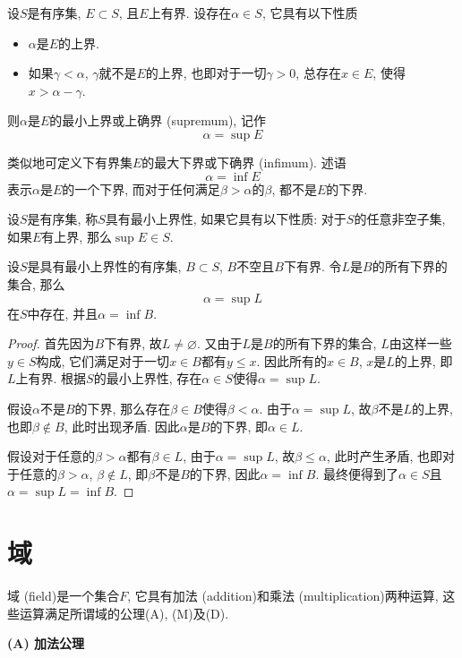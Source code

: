 \documentclass[cn,12pt,math=mtpro2,citestyle=gb7714-2015,bibstyle=gb7714-2015,twocol]{elegantbook}
\let\emptyset\varnothing
\begin{document}
\begin{definition}
设$S$是有序集, $E\subset S$, 且$E$上有界. 设存在$\alpha\in S$, 它具有以下性质
\begin{itemize}
\item $\alpha$是$E$的上界.

\item 如果$\gamma<\alpha$, $\gamma$就不是$E$的上界, 也即对于一切$\gamma>0$, 总存在$ x\in E$, 使得$x>\alpha-\gamma$.
\end{itemize}
则$\alpha$是$E$的最小上界或上确界 (supremum), 记作
$$\alpha=\sup E$$
\end{definition}
类似地可定义下有界集$E$的最大下界或下确界 (infimum). 述语
$$\alpha=\inf E$$
表示$\alpha$是$E$的一个下界, 而对于任何满足$\beta>\alpha$的$\beta$, 都不是$E$的下界.

\begin{definition}
设$S$是有序集, 称$S$具有最小上界性, 如果它具有以下性质: 对于$S$的任意非空子集, 如果$E$有上界, 那么$\sup E\in S$.
\end{definition}

\begin{theorem}
  设$S$是具有最小上界性的有序集, $B\subset S$, $B$不空且$B$下有界. 令$L$是$B$的所有下界的集合, 那么
  $$\alpha=\sup L$$
  在$S$中存在, 并且$\alpha=\inf B$.
\end{theorem}
\begin{proof}
  首先因为$B$下有界, 故$L\neq \emptyset$. 又由于$L$是$B$的所有下界的集合, $L$由这样一些$y\in S$构成, 它们满足对于一切$x \in B$都有$y\leq x$. 因此所有的$x \in B$, $x$是$L$的上界, 即$L$上有界. 根据$S$的最小上界性, 存在$ \alpha\in S$使得$\alpha=\sup L$.

  假设$\alpha$不是$B$的下界, 那么存在$\beta\in B$使得$\beta<\alpha$. 由于$\alpha=\sup L$, 故$\beta$不是$L$的上界, 也即$\beta \notin B$, 此时出现矛盾. 因此$\alpha$是$B$的下界, 即$\alpha \in L$.

  假设对于任意的$\beta>\alpha$都有$\beta\in L$, 由于$\alpha=\sup L$, 故$\beta\leq\alpha$, 此时产生矛盾, 也即对于任意的$\beta>\alpha$, $\beta\notin L$, 即$\beta$不是$B$的下界, 因此$\alpha=\inf B$. 最终便得到了$\alpha\in S$且$\alpha=\sup L=\inf B$.
\end{proof}
\section{域}
\begin{definition}\label{de0}
域 (field)是一个集合$F$, 它具有加法 (addition)和乘法 (multiplication)两种运算, 这些运算满足所谓域的公理(A), (M)及(D).
\end{definition}
\textbf{(A) 加法公理}
\end{document}
